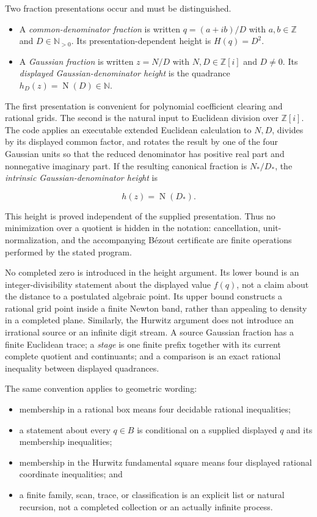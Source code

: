 \documentclass[11pt]{article}
\newcommand{\Zi}{\mathbb{Z}[i]}
\newcommand{\N}{\mathbb{N}}
\newcommand{\Z}{\mathbb{Z}}
\newcommand{\Norm}[1]{\operatorname{N}\!\left(#1\right)}
\begin{document}
Two fraction presentations occur and must be distinguished.
\begin{itemize}
\item A \emph{common-denominator fraction} is written
$q=(a+ib)/D$ with $a,b\in\Z$ and $D\in\N_{>0}$.  Its presentation-dependent
height is $H(q)=D^2$.

\item A \emph{Gaussian fraction} is written $z=N/D$ with $N,D\in\Zi$ and
$D\ne0$.  Its \emph{displayed Gaussian-denominator height} is the
quadrance $h_D(z)=\Norm D\in\N$.
\end{itemize}
The first presentation is convenient for polynomial coefficient clearing and
rational grids.  The second is the natural input to Euclidean division over
$\Zi$.  The code applies an executable extended Euclidean calculation to
$N,D$, divides by its displayed common factor, and rotates the result by one
of the four Gaussian units so that the reduced denominator has positive real
part and nonnegative imaginary part.  If the resulting canonical fraction is
$N_*/D_*$, the \emph{intrinsic Gaussian-denominator height} is

\[
                              h(z)=\Norm{D_*}.
\]

This height is proved independent of the supplied presentation.  Thus no
minimization over a quotient is hidden in the notation: cancellation,
unit-normalization, and the accompanying B\'ezout certificate are finite
operations performed by the stated program.

No completed zero is introduced in the height argument.  Its lower bound is
an integer-divisibility statement about the displayed value $f(q)$, not a
claim about the distance to a postulated algebraic point.  Its upper bound
constructs a rational grid point inside a finite Newton band, rather than
appealing to density in a completed plane.  Similarly, the Hurwitz argument
does not introduce an irrational source or an infinite digit stream.  A
source Gaussian fraction has a finite Euclidean trace; a \emph{stage} is one
finite prefix together with its current complete quotient and continuants;
and a comparison is an exact rational inequality between displayed
quadrances.

The same convention applies to geometric wording:
\begin{itemize}
\item membership in a rational box means four decidable rational
inequalities;
\item a statement about every $q\in B$ is conditional on a supplied displayed
$q$ and its membership inequalities;
\item membership in the Hurwitz fundamental square means four displayed
rational coordinate inequalities; and
\item a finite family, scan, trace, or classification is an explicit list or
natural recursion, not a completed collection or an actually infinite
process.
\end{itemize}
\end{document}
